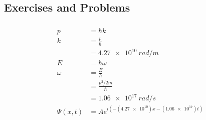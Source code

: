 \documentclass{article}
\begin{document}
\subsection{Exercises and Problems}

\subsubsection{}

\begin{align*}
  p          & = \hbar k                                          \\
  k          & = \frac{p}{\hbar}                                  \\
             & = \qty{4.27e10}{rad/m}                             \\
  E          & = \hbar \omega                                     \\
  \omega     & = \frac{E}{\hbar}                                  \\
             & = \frac{p^2 / 2 m}{\hbar}                          \\
             & = \qty{1.06e17}{rad/s}                             \\
  \Psi(x, t) & = A e^{i (-(\num{4.27e10}) x - (\num{1.06e17}) t)}
\end{align*}

\setcounter{subsubsection}{2}
\subsubsection{}
\end{document}
